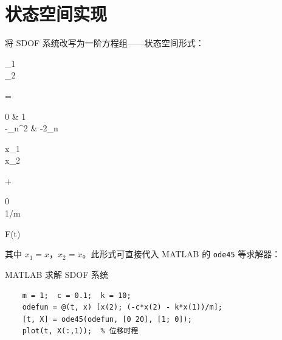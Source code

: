 \section{状态空间实现}

将 SDOF 系统改写为一阶方程组——状态空间形式：
\begin{myformula}
	\begin{pmatrix} _1 \\ _2 \end{pmatrix}
	=
	\begin{pmatrix} 0 & 1 \\ -\omega_n^2 & -2\zeta\omega_n \end{pmatrix}
	\begin{pmatrix} x_1 \\ x_2 \end{pmatrix}
	+
	\begin{pmatrix} 0 \\ 1/m \end{pmatrix} F(t)
\end{myformula}
其中 $x_1 = x$，$x_2 = \dot{x}$。此形式可直接代入 MATLAB 的 \texttt{ode45} 等求解器：

\begin{example}{MATLAB 求解 SDOF 系统}
	\begin{verbatim}
	m = 1;  c = 0.1;  k = 10;
	odefun = @(t, x) [x(2); (-c*x(2) - k*x(1))/m];
	[t, X] = ode45(odefun, [0 20], [1; 0]);
	plot(t, X(:,1));  % 位移时程
	\end{verbatim}
\end{example}
